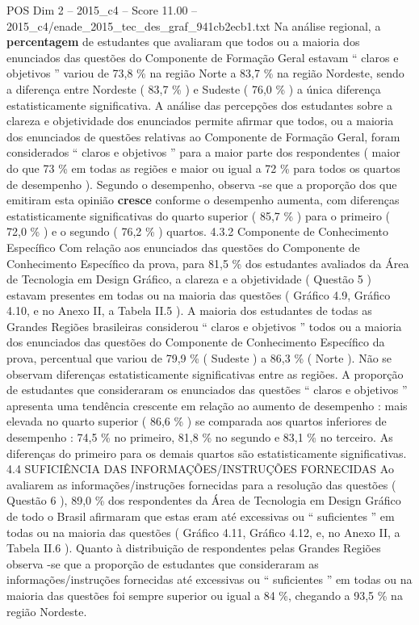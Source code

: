 \begin{textsample}{POS Dim 2 – 2015\_c4 – Score 11.00 – 2015\_c4/enade\_2015\_tec\_des\_graf\_941cb2ecb1.txt}
Na análise regional, a \textbf{percentagem} de estudantes que avaliaram que todos ou a maioria dos enunciados das questões do Componente de Formação Geral estavam “ claros e objetivos ” variou de 73,8 \% na região Norte a 83,7 \% na região Nordeste, sendo a diferença entre Nordeste ( 83,7 \% ) e Sudeste ( 76,0 \% ) a única diferença estatisticamente significativa.
A análise das percepções dos estudantes sobre a clareza e objetividade dos enunciados permite afirmar que todos, ou a maioria dos enunciados de questões relativas ao Componente de Formação Geral, foram considerados “ claros e objetivos ” para a maior parte dos respondentes ( maior do que 73 \% em todas as regiões e maior ou igual a 72 \% para todos os quartos de desempenho ).
Segundo o desempenho, observa -se que a proporção dos que emitiram esta opinião \textbf{cresce} conforme o desempenho aumenta, com diferenças estatisticamente significativas do quarto superior ( 85,7 \% ) para o primeiro ( 72,0 \% ) e o segundo ( 76,2 \% ) quartos. 4.3.2 Componente de Conhecimento Específico Com relação aos enunciados das questões do Componente de Conhecimento Específico da prova, para 81,5 \% dos estudantes avaliados da Área de Tecnologia em Design Gráfico, a clareza e a objetividade ( Questão 5 ) estavam presentes em todas ou na maioria das questões ( Gráfico 4.9, Gráfico 4.10, e no Anexo II, a Tabela II.5 ).
A maioria dos estudantes de todas as Grandes Regiões brasileiras considerou “ claros e objetivos ” todos ou a maioria dos enunciados das questões do Componente de Conhecimento Específico da prova, percentual que variou de 79,9 \% ( Sudeste ) a 86,3 \% ( Norte ).
Não se observam diferenças estatisticamente significativas entre as regiões.
A proporção de estudantes que consideraram os enunciados das questões “ claros e objetivos ” apresenta uma tendência crescente em relação ao aumento de desempenho : mais elevada no quarto superior ( 86,6 \% ) se comparada aos quartos inferiores de desempenho : 74,5 \% no primeiro, 81,8 \% no segundo e 83,1 \% no terceiro.
As diferenças do primeiro para os demais quartos são estatisticamente significativas. 4.4 SUFICIÊNCIA DAS INFORMAÇÕES/INSTRUÇÕES FORNECIDAS Ao avaliarem as informações/instruções fornecidas para a resolução das questões ( Questão 6 ), 89,0 \% dos respondentes da Área de Tecnologia em Design Gráfico de todo o Brasil afirmaram que estas eram até excessivas ou “ suficientes ” em todas ou na maioria das questões ( Gráfico 4.11, Gráfico 4.12, e, no Anexo II, a Tabela II.6 ).
Quanto à distribuição de respondentes pelas Grandes Regiões observa -se que a proporção de estudantes que consideraram as informações/instruções fornecidas até excessivas ou “ suficientes ” em todas ou na maioria das questões foi sempre superior ou igual a 84 \%, chegando a 93,5 \% na região Nordeste.

\end{textsample}
